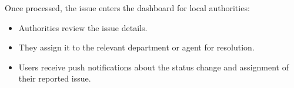 Once processed, the issue enters the dashboard for local authorities:
\begin{itemize}
    \item Authorities review the issue details.
    \item They assign it to the relevant department or agent for resolution.
    \item Users receive push notifications about the status change and assignment of their reported issue.
\end{itemize}